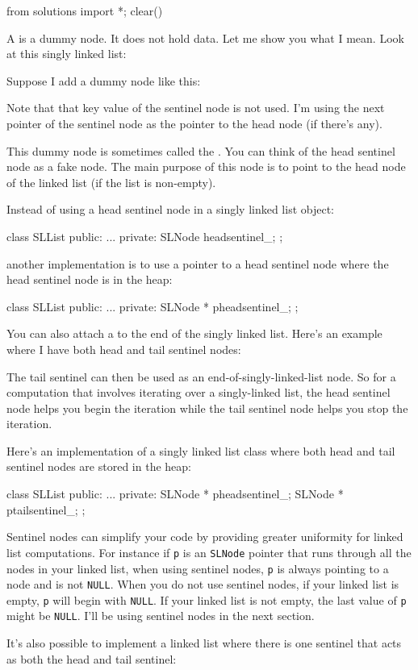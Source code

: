 \begin{python0}
from solutions import *; clear()
\end{python0}

A  is a dummy node.
It does not hold data.
Let me show you what I mean.
Look at this singly linked list:



Suppose I add a dummy node like this:



Note that that key value of the sentinel node is not used.
I'm using the next pointer of the sentinel node as the pointer to
the head node (if there's any).

This dummy node is sometimes called the .
You can think of the head sentinel node as a fake node.
The main purpose of this node is to point to the head node of the linked list
(if the list is non-empty).

Instead of using a head sentinel node in a singly linked list object:
\begin{console}
class SLList
{
public:
    ... 
private:
    SLNode headsentinel_;
};
\end{console}
another implementation is to use a pointer to a head sentinel node
where the head sentinel node is in the heap:
\begin{console}
class SLList
{
public:
    ... 
private:
    SLNode * pheadsentinel_;
};
\end{console}

You can also attach a  to the end of the
singly linked list.
Here's an example where I have both head and tail sentinel nodes:

The tail sentinel can then be used as an end-of-singly-linked-list node.
So for a computation that involves iterating over a singly-linked list,
the head sentinel node helps you begin the iteration while the
tail sentinel node helps you stop the iteration.

Here's an implementation of a singly linked list class
where both head and tail sentinel nodes are stored
in the heap:
\begin{console}
class SLList
{
public:
    ... 
private:
    SLNode * pheadsentinel_;
    SLNode * ptailsentinel_;
};
\end{console}

Sentinel nodes can simplify your code by providing greater
uniformity for linked list computations.
For instance if \verb!p! is an \verb!SLNode! pointer that
runs through all the nodes in your linked list,
when using sentinel nodes, 
\verb!p! is always pointing to a node
and is not \verb!NULL!.
When you do not use sentinel nodes,
if your linked list is empty, \verb!p! will begin with
\verb!NULL!.
If your linked list is not empty, the last value of \verb!p!
might be \verb!NULL!.
I'll be using sentinel nodes in the next section.

It's also possible to implement a linked list where
there is one sentinel that acts as both the head and tail sentinel:

